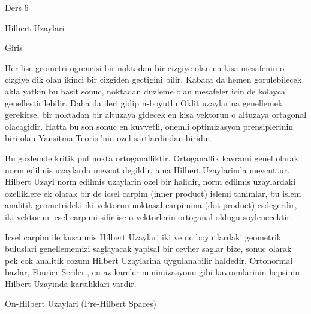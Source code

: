 \documentclass[12pt,fleqn]{article}\usepackage{../common}
\begin{document}
Ders 6

Hilbert Uzaylari 

Giris 

Her lise geometri ogrencisi bir noktadan bir cizgiye olan en kisa mesafenin
o cizgiye dik olan ikinci bir cizgiden gectigini bilir. Kabaca da hemen
gorulebilecek akla yatkin bu basit sonuc, noktadan duzleme olan mesafeler
icin de kolayca genellestirilebilir. Daha da ileri gidip n-boyutlu Oklit
uzaylarina genellemek gerekirse, bir noktadan bir altuzaya gidecek en kisa
vektorun o altuzaya ortagonal olacagidir. Hatta bu son sonuc en kuvvetli,
onemli optimizasyon prensiplerinin biri olan Yansitma Teorisi'nin ozel
sartlardindan biridir.

Bu gozlemde kritik puf nokta ortoganalliktir. Ortoganallik kavrami genel
olarak norm edilmis uzaylarda mevcut degildir, ama Hilbert Uzaylarinda
mevcuttur. Hilbert Uzayi norm edilmis uzaylarin ozel bir halidir, norm
edilmis uzaylardaki ozelliklere ek olarak bir de icsel carpim (inner
product) islemi tanimlar, bu islem analitik geometrideki iki vektorun
noktasal carpimina (dot product) esdegerdir, iki vektorun icsel carpimi
sifir ise o vektorlerin ortoganal oldugu soylenecektir. 

Icsel carpim ile kusanmis Hilbert Uzaylari iki ve uc boyutlardaki geometrik
buluslari genellememizi saglayacak yapisal bir cevher saglar bize, sonuc
olarak pek cok analitik cozum Hilbert Uzaylarina uygulanabilir
haldedir. Ortonormal bazlar, Fourier Serileri, en az kareler minimizasyonu
gibi kavramlarinin hepsinin Hilbert Uzayinda karsiliklari vardir. 

On-Hilbert Uzaylari (Pre-Hilbert Spaces)
\end{document}
